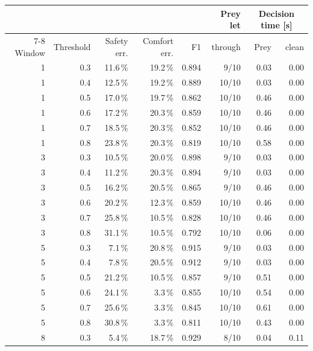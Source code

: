 \begin{table}[H]
    \centering
    \footnotesize
    \renewcommand{\arraystretch}{0.92}
    \begin{tabular}{rrrrrrrr}
        \toprule
        & & & & & Prey let & \multicolumn{2}{c}{Decision time [s]} \\
        \cmidrule(lr){7-8}
        Window & Threshold & Safety err. & Comfort err. & F1 & through & Prey & clean \\
        \midrule
        1 & 0.3 & 11.6\,\% & 19.2\,\% & 0.894 & 9/10 & 0.03 & 0.00 \\
        1 & 0.4 & 12.5\,\% & 19.2\,\% & 0.889 & 10/10 & 0.03 & 0.00 \\
        1 & 0.5 & 17.0\,\% & 19.7\,\% & 0.862 & 10/10 & 0.46 & 0.00 \\
        1 & 0.6 & 17.2\,\% & 20.3\,\% & 0.859 & 10/10 & 0.46 & 0.00 \\
        1 & 0.7 & 18.5\,\% & 20.3\,\% & 0.852 & 10/10 & 0.46 & 0.00 \\
        1 & 0.8 & 23.8\,\% & 20.3\,\% & 0.819 & 10/10 & 0.58 & 0.00 \\
        \midrule
        3 & 0.3 & 10.5\,\% & 20.0\,\% & 0.898 & 9/10 & 0.03 & 0.00 \\
        3 & 0.4 & 11.2\,\% & 20.3\,\% & 0.894 & 9/10 & 0.03 & 0.00 \\
        3 & 0.5 & 16.2\,\% & 20.5\,\% & 0.865 & 9/10 & 0.46 & 0.00 \\
        3 & 0.6 & 20.2\,\% & 12.3\,\% & 0.859 & 10/10 & 0.46 & 0.00 \\
        3 & 0.7 & 25.8\,\% & 10.5\,\% & 0.828 & 10/10 & 0.46 & 0.00 \\
        3 & 0.8 & 31.1\,\% & 10.5\,\% & 0.792 & 10/10 & 0.06 & 0.00 \\
        \midrule
        5 & 0.3 & 7.1\,\% & 20.8\,\% & 0.915 & 9/10 & 0.03 & 0.00 \\
        5 & 0.4 & 7.8\,\% & 20.5\,\% & 0.912 & 9/10 & 0.03 & 0.00 \\
        5 & 0.5 & 21.2\,\% & 10.5\,\% & 0.857 & 9/10 & 0.51 & 0.00 \\
        5 & 0.6 & 24.1\,\% & 3.3\,\% & 0.855 & 10/10 & 0.54 & 0.00 \\
        5 & 0.7 & 25.6\,\% & 3.3\,\% & 0.845 & 10/10 & 0.61 & 0.00 \\
        5 & 0.8 & 30.8\,\% & 3.3\,\% & 0.811 & 10/10 & 0.43 & 0.00 \\
        \midrule
        8 & 0.3 & 5.4\,\% & 18.7\,\% & 0.929 & 8/10 & 0.04 & 0.11 \\

\end{tabular}
\end{table}
